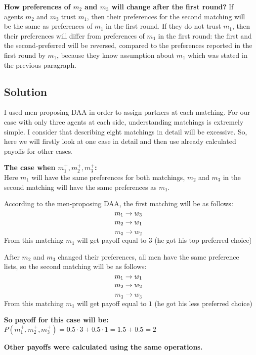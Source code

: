 \documentclass[a4paper]{article} %
\begin{document}
\hfill
\break
\textbf{How preferences of $m_2$ and $m_3$ will change after the first round?}
If agents $m_2$ and $m_3$ trust $m_1$, then their preferences for the second matching will be the same as preferences of $m_1$ in the first round. If they do not trust $m_1$, then their preferences will differ from preferences of $m_1$ in the first round: the first and the second-preferred will be reversed, compared to the preferences reported in the first round by $m_1$, because they know assumption about $m_1$ which was stated in the previous paragraph.






\subsection{Solution}
I used men-proposing DAA in order to assign partners at each matching. For our case with only three agents at each side, understanding matchings is extremely simple. 
I consider that describing eight matchings in detail will be excessive. 
So, here we will firstly look at one case in detail and then use already calculated payoffs for other cases.

\hfill
\break
\textbf{The case when $m_1^+,m_2^+,m_3^+$:}\\
Here $m_1$ will have the same preferences for both matchings, $m_2$ and $m_3$ in the second matching will have the same preferences as $m_1$.

\hfill
\break
According to the men-proposing DAA, the first matching will be as follows:
\[
    m_1 \rightarrow w_3\\
\]
\[   
    m_2 \rightarrow w_1\\
\]
\[
    m_3 \rightarrow w_2
\]
From this matching $m_1$ will get payoff equal to $3$ (he got his top preferred choice)

\hfill
\break
After $m_2$ and $m_3$ changed their preferences, all men have the same preference lists, so the second matching will be as follows:
\[
    m_1 \rightarrow w_1\\
\]
\[   
    m_2 \rightarrow w_2\\
\]
\[
    m_3 \rightarrow w_3
\]
From this matching $m_1$ will get payoff equal to $1$ (he got his less preferred choice)

\hfill
\break
\textbf{So payoff for this case will be:}
$P(m_1^+,m_2^+,m_3^+) = 0.5 \cdot 3 + 0.5 \cdot 1 = 1.5 + 0.5 = 2$


\hfill
\break
\textbf{Other payoffs were calculated using the same operations.}
\end{document}
